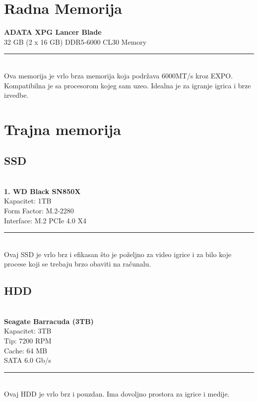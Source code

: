 \documentclass{article}
\begin{document}
\section{Radna Memorija}
\textbf{ADATA XPG Lancer Blade}
\\ 32 GB (2 x 16 GB) DDR5-6000 CL30 Memory
\\ \rule{\textwidth}{0.5pt}
\\ Ova memorija je vrlo brza memorija koja podržava 6000MT/s kroz EXPO. Kompatibilna je sa procesorom kojeg sam uzeo. Idealna je za igranje igrica i brze izvedbe.

\section{Trajna memorija}
\subsection{SSD}
\\ \textbf{1. WD Black SN850X}
\\ Kapacitet: 1TB
\\ Form Factor: M.2-2280
\\ Interface: M.2 PCIe 4.0 X4
\\ \rule{\textwidth}{0.5pt}
\\ Ovaj SSD je vrlo brz i efikasan što je poželjno za video igrice i za bilo koje procese koji se trebaju brzo obaviti na računalu.

\subsection{HDD}
\\ \textbf{Seagate Barracuda (3TB)}
\\ Kapacitet: 3TB
\\ Tip: 7200 RPM
\\ Cache: 64 MB
\\ SATA 6.0 Gb/s
\\ \rule{\textwidth}{0.5pt}
\\ Ovaj HDD je vrlo brz i pouzdan. Ima dovoljno prostora za igrice i medije.
\end{document}

